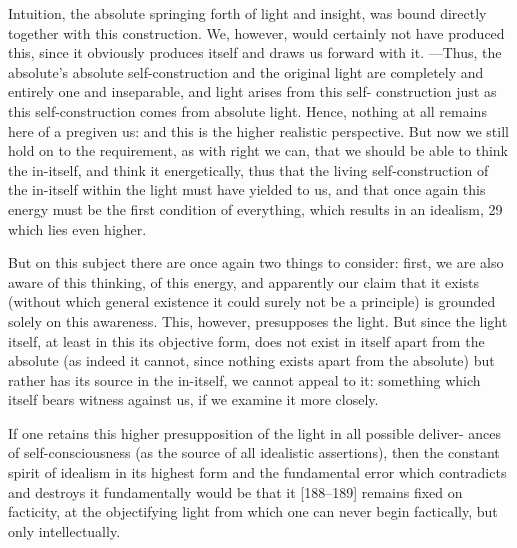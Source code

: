 Intuition, the absolute springing forth of light and insight, was bound
directly together with this construction.
We, however, would certainly not
have produced this, since it obviously produces itself and draws us forward
with it.
—Thus, the absolute’s absolute self-construction and the original light
are completely and entirely one and inseparable, and light arises from this self-
construction just as this self-construction comes from absolute light.
Hence,
nothing at all remains here of a pregiven us: and this is the higher realistic
perspective.
But now we still hold on to the requirement, as with right we can,
that we should be able to think the in-itself, and think it energetically, thus
that the living self-construction of the in-itself within the light must have
yielded to us, and that once again this energy must be the first condition of
everything, which results in an idealism, 29 which lies even higher.

But on this subject there are once again two things to consider: first, we
are also aware of this thinking, of this energy, and apparently our claim that it
exists (without which general existence it could surely not be a principle) is
grounded solely on this awareness.
This, however, presupposes the light.
But
since the light itself, at least in this its objective form, does not exist in itself
apart from the absolute (as indeed it cannot, since nothing exists apart from
the absolute) but rather has its source in the in-itself, we cannot appeal to it:
something which itself bears witness against us, if we examine it more closely.

If one retains this higher presupposition of the light in all possible deliver-
ances of self-consciousness (as the source of all idealistic assertions), then the
constant spirit of idealism in its highest form and the fundamental error
which contradicts and destroys it fundamentally would be that it [188–189]
remains fixed on facticity, at the objectifying light from which one can never
begin factically, but only intellectually.

